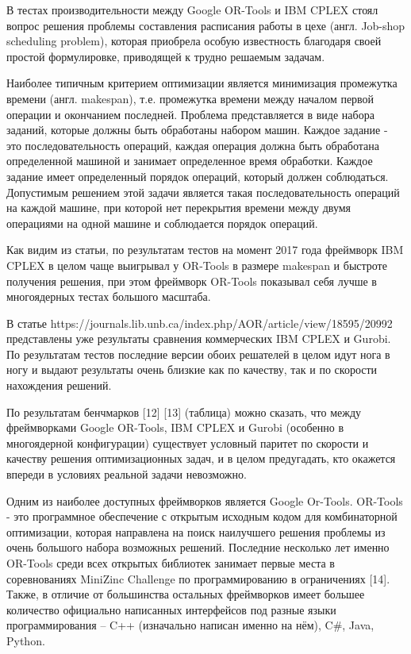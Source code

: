 В тестах производительности между Google OR-Tools и IBM CPLEX стоял вопрос решения проблемы составления расписания работы в цехе (англ. Job-shop scheduling problem), которая приобрела особую известность благодаря своей простой формулировке, приводящей к трудно решаемым задачам.

Наиболее типичным критерием оптимизации является минимизация промежутка времени (англ. makespan), т.е. промежутка времени между началом первой операции и окончанием последней. Проблема представляется в виде набора заданий, которые должны быть обработаны набором машин. Каждое задание - это последовательность операций, каждая операция должна быть обработана определенной машиной и занимает определенное время обработки. Каждое задание имеет определенный порядок операций, который должен соблюдаться. Допустимым решением этой задачи является такая последовательность операций на каждой машине, при которой нет перекрытия времени между двумя операциями на одной машине и соблюдается порядок операций.

Как видим из статьи, по результатам тестов на момент 2017 года фреймворк IBM CPLEX в целом чаще выигрывал у OR-Tools в размере makespan и быстроте получения решения, при этом фреймворк OR-Tools показывал себя лучше в многоядерных тестах большого масштаба.

В статье https://journals.lib.unb.ca/index.php/AOR/article/view/18595/20992 представлены уже результаты сравнения коммерческих IBM CPLEX и Gurobi. По результатам тестов последние версии обоих решателей в целом идут нога в ногу и выдают результаты очень близкие как по качеству, так и по скорости нахождения решений.

По результатам бенчмарков [12] [13] (таблица) можно сказать, что между фреймворками Google OR-Tools, IBM CPLEX и Gurobi (особенно в многоядерной конфигурации) существует условный паритет по скорости и качеству решения оптимизационных задач, и в целом предугадать, кто окажется впереди в условиях реальной задачи невозможно.

Одним из наиболее доступных фреймворков является Google Or-Tools. OR-Tools - это программное обеспечение с открытым исходным кодом для комбинаторной оптимизации, которая направлена на поиск наилучшего решения проблемы из очень большого набора возможных решений. Последние несколько лет именно OR-Tools среди всех открытых библиотек занимает первые места в соревнованиях MiniZinc Challenge по программированию в ограничениях [14]. Также, в отличие от большинства остальных фреймворков имеет большее количество официально написанных интерфейсов под разные языки программирования – C++ (изначально написан именно на нём), C\#, Java, Python.


